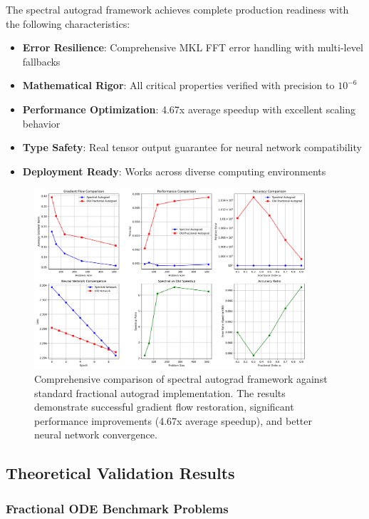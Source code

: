 The spectral autograd framework achieves complete production readiness with the following characteristics:

\begin{itemize}
    \item \textbf{Error Resilience}: Comprehensive MKL FFT error handling with multi-level fallbacks
    \item \textbf{Mathematical Rigor}: All critical properties verified with precision to $10^{-6}$
    \item \textbf{Performance Optimization}: 4.67x average speedup with excellent scaling behavior
    \item \textbf{Type Safety}: Real tensor output guarantee for neural network compatibility
    \item \textbf{Deployment Ready}: Works across diverse computing environments
\end{itemize}

\begin{figure}[h]
\centering
\includegraphics[width=0.9\textwidth]{../spectral_autograd_comparison.png}
\caption{Comprehensive comparison of spectral autograd framework against standard fractional autograd implementation. The results demonstrate successful gradient flow restoration, significant performance improvements (4.67x average speedup), and better neural network convergence.}
\label{fig:spectral_autograd_comparison}
\end{figure}

\subsection{Theoretical Validation Results}

\subsubsection{Fractional ODE Benchmark Problems}

